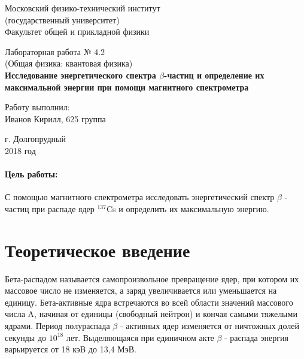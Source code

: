 \documentclass[12pt]{kiarticle} %
\newcommand{\be}{\ensuremath{\beta}}
\begin{document}
	
	\begin{titlepage}
		\begin{center}
			\large 	Московский физико-технический институт \\
			(государственный университет) \\
			Факультет общей и прикладной физики \\
			\vspace{0.2cm}
			
			\vspace{4.5cm}
			Лабораторная работа № 4.2 \\ \vspace{0.2cm}
			\large (Общая физика: квантовая физика) \\ \vspace{0.2cm}
			\LARGE \textbf{ Исследование энергетического спектра \be-частиц
				и определение их максимальной энергии при помощи
				магнитного спектрометра }
		\end{center}
		\vspace{2.3cm} \large
		
		\begin{center}
			Работу выполнил: \\
			Иванов Кирилл,
			625 группа
			\vspace{10mm}		
			
		\end{center}
		
		\begin{center} \vspace{60mm}
			г. Долгопрудный \\
			2018 год
		\end{center}
	\end{titlepage}


\paragraph*{Цель работы:} С помощью магнитного спектрометра исследовать энергетический спектр $\beta$ - частиц при распаде ядер $^{137}$Cs  и определить их максимальную энергию.

\section{Теоретическое введение} 

Бета-распадом называется самопроизвольное превращение ядер, при котором их массовое число не изменяется, а заряд увеличивается или уменьшается на единицу. Бета-активные ядра встречаются во всей области значений массового числа A, начиная от единицы (свободный нейтрон) и кончая самыми тяжелыми ядрами. Период полураспада $\beta$ - активных ядер изменяется от ничтожных долей секунды до $10^{18}$ лет. Выделяющаяся при единичном акте $\beta$ - распада энергия варьируется от 18 кэВ до 13,4 МэВ.
\end{document}
